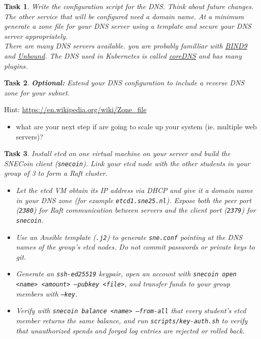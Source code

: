 \documentclass[11pt,a4paper]{exam}
\newcommand{\question}[1]{\begin{itemize}\item[$Q:$]{#1}\end{itemize}}
\newtheorem{task}{Task}
\begin{document}
\begin{task}
Write the configuration script for the DNS. Think about future changes. The other service that will be configured need a domain name. At a minimum generate a zone file for your DNS server using a template and secure your DNS server appropriately. \\

\noindent There are many DNS servers available. you are probably familliar with \href{https://bind9.readthedocs.io/en/v9.20.13/}{BIND9} and \href{https://www.unbound.org/}{Unbound}. The DNS used in Kubernetes is called \href{https://coredns.io/}{coreDNS} and has many plugins.
\end{task}

\begin{task}
\textup{\textbf{Optional:}} Extend your DNS configuration to include a reverse DNS zone for your subnet.
\end{task}

\noindent Hint: \url{https://en.wikipedia.org/wiki/Zone\_file}

\question{what are your next step if are going to scale up your system (ie. multiple web servers)?}

\begin{task}
Install etcd on one virtual machine on your server and build the SNECoin client (\texttt{snecoin}). Link your etcd node with the other students in your group of 3 to form a Raft cluster.

\begin{itemize}
    \item Let the etcd VM obtain its IP address via DHCP and give it a domain name in your DNS zone (for example \texttt{etcd1.sne25.nl}). Expose both the peer port (\texttt{2380}) for Raft communication between servers and the client port (\texttt{2379}) for \texttt{snecoin}.
    \item Use an Ansible template (\texttt{.j2}) to generate \texttt{sne.conf} pointing at the DNS names of the group's etcd nodes. Do not commit passwords or private keys to git.
    \item Generate an \texttt{ssh-ed25519} keypair, open an account with \texttt{snecoin open <name> <amount> --pubkey <file>}, and transfer funds to your group members with \texttt{--key}.
    \item Verify with \texttt{snecoin balance <name> --from-all} that every student's etcd member returns the same balance, and run \texttt{scripts/key-auth.sh} to verify that unauthorized spends and forged log entries are rejected or rolled back.
\end{itemize}
\end{task}
\end{document}
